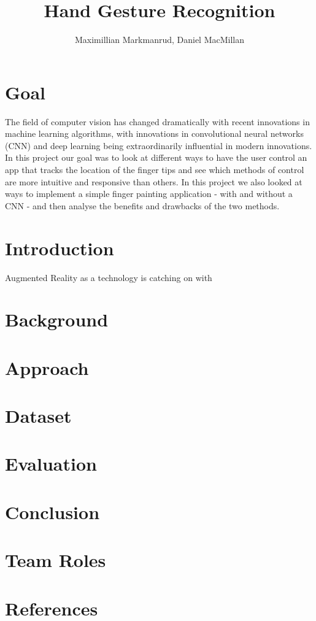 \documentclass[twocolumn]{article}
\title{Hand Gesture Recognition}
\author{Maximillian Markmanrud, Daniel MacMillan}
\begin{document}
\maketitle

\section{Goal}
The field of computer vision has changed dramatically with recent innovations in machine learning algorithms, with innovations in convolutional neural networks (CNN) and deep learning being extraordinarily influential in modern innovations. In this project our goal was to look at different ways to have the user control an app that tracks the location of the finger tips and see which methods of control are more intuitive and responsive than others. In this project we also looked at ways to implement a simple finger painting application - with and without a CNN - and then analyse the benefits and drawbacks of the two methods.

\section{Introduction}
Augmented Reality as a technology is catching on with 


\section{Background}


\section{Approach}


\section{Dataset}


\section{Evaluation}


\section{Conclusion}


\section{Team Roles}


\section{References}
\end{document}

